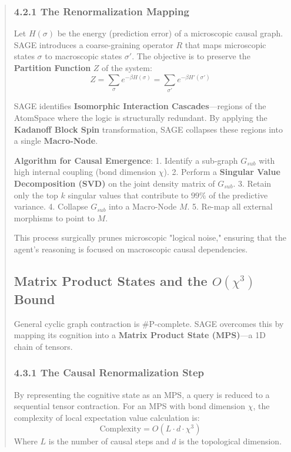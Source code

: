 \documentclass[10pt,twocolumn,letterpaper]{article}
\begin{document}
\begin{abstract}
\subsubsection{4.2.1 The Renormalization Mapping}
Let $H(\sigma)$ be the energy (prediction error) of a microscopic causal graph. SAGE introduces a coarse-graining operator $R$ that maps microscopic states $\sigma$ to macroscopic states $\sigma'$. The objective is to preserve the \textbf{Partition Function} $Z$ of the system:
$$ Z = \sum_{\sigma} e^{-\beta H(\sigma)} = \sum_{\sigma'} e^{-\beta H'(\sigma')} $$

SAGE identifies \textbf{Isomorphic Interaction Cascades}—regions of the AtomSpace where the logic is structurally redundant. By applying the \textbf{Kadanoff Block Spin} transformation, SAGE collapses these regions into a single \textbf{Macro-Node}.

\textbf{Algorithm for Causal Emergence}:
1.  Identify a sub-graph $G_{sub}$ with high internal coupling (bond dimension $\chi$).
2.  Perform a \textbf{Singular Value Decomposition (SVD)} on the joint density matrix of $G_{sub}$.
3.  Retain only the top $k$ singular values that contribute to $99\%$ of the predictive variance.
4.  Collapse $G_{sub}$ into a Macro-Node $M$.
5.  Re-map all external morphisms to point to $M$.

This process surgically prunes microscopic "logical noise," ensuring that the agent’s reasoning is focused on macroscopic causal dependencies.

\subsection{Matrix Product States and the $O(\chi^3)$ Bound}

General cyclic graph contraction is #P-complete. SAGE overcomes this by mapping its cognition into a \textbf{Matrix Product State (MPS)}—a 1D chain of tensors.

\subsubsection{4.3.1 The Causal Renormalization Step}
By representing the cognitive state as an MPS, a query is reduced to a sequential tensor contraction. For an MPS with bond dimension $\chi$, the complexity of local expectation value calculation is:
$$ \text{Complexity} = O(L \cdot d \cdot \chi^3) $$
Where $L$ is the number of causal steps and $d$ is the topological dimension. 


\end{abstract}
\end{document}
